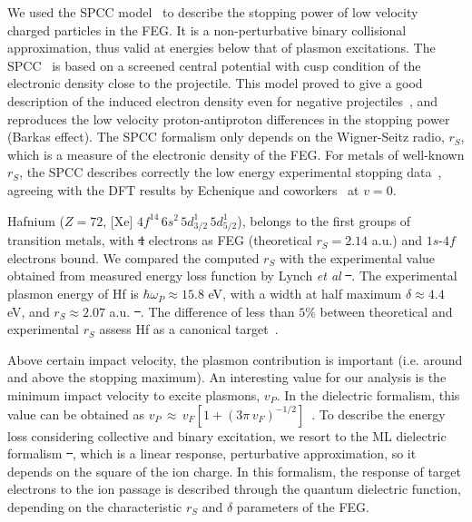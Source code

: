 \documentclass[aps,pra,reprint,groupedaddress,showpacs,showkeys]{revtex4-1} %
\providecommand{\DIFadd}[1]{{\protect\color{blue}\uwave{#1}}} %
\providecommand{\DIFdel}[1]{{\protect\color{red}\sout{#1}}}                      %
\providecommand{\DIFaddbegin}{} %
\providecommand{\DIFaddend}{} %
\providecommand{\DIFdelbegin}{} %
\providecommand{\DIFdelend}{} %
\newcommand{\DIFscaledelfig}{0.5}
\newlength{\DIFdelgraphicswidth} %
\newlength{\DIFdelgraphicsheight} %
\newcommand{\DIFaddincludegraphics}[2][]{{\color{blue}\fbox{\DIFOincludegraphics[#1]{#2}}}} %
\newcommand{\DIFdelincludegraphics}[2][]{%
\sbox{\DIFdelgraphicsbox}{\DIFOincludegraphics[#1]{#2}}%
\settoboxwidth{\DIFdelgraphicswidth}{\DIFdelgraphicsbox} %
\settoboxtotalheight{\DIFdelgraphicsheight}{\DIFdelgraphicsbox} %
\scalebox{\DIFscaledelfig}{%
\parbox[b]{\DIFdelgraphicswidth}{\usebox{\DIFdelgraphicsbox}\\[-\baselineskip] \rule{\DIFdelgraphicswidth}{0em}}\llap{\resizebox{\DIFdelgraphicswidth}{\DIFdelgraphicsheight}{%
\setlength{\unitlength}{\DIFdelgraphicswidth}%
\begin{picture}(1,1)%
\thicklines\linethickness{2pt} %
{\color[rgb]{1,0,0}\put(0,0){\framebox(1,1){}}}%
{\color[rgb]{1,0,0}\put(0,0){\line( 1,1){1}}}%
{\color[rgb]{1,0,0}\put(0,1){\line(1,-1){1}}}%
\end{picture}%
}\hspace*{3pt}}} %
} %
\DeclareRobustCommand{\DIFaddbegin}{\DIFOaddbegin \let\includegraphics\DIFaddincludegraphics} %
\DeclareRobustCommand{\DIFaddend}{\DIFOaddend \let\includegraphics\DIFOincludegraphics} %
\DeclareRobustCommand{\DIFdelbegin}{\DIFOdelbegin \let\includegraphics\DIFdelincludegraphics} %
\DeclareRobustCommand{\DIFdelend}{\DIFOaddend \let\includegraphics\DIFOincludegraphics} %
\begin{document}
We used the SPCC model~\cite{mon17} to describe the stopping power of 
low velocity charged particles in the FEG. It is a non-perturbative 
binary collisional approximation, thus valid at energies below that of 
plasmon excitations.  The SPCC~\cite{mon17} is based on a screened 
central potential with cusp condition of the electronic density close 
to the projectile. This model proved to give a good description of the 
induced electron density even for negative projectiles~\cite{mon17}, 
and reproduces the low velocity proton-antiproton differences in the 
stopping power (Barkas effect). The SPCC formalism only depends on the 
Wigner-Seitz radio, $r_S$, which is a measure of the electronic density 
of the FEG. For metals of well-known $r_S$, the SPCC describes correctly 
the low energy experimental stopping data~\cite{mon17}, agreeing with 
the DFT results by Echenique and coworkers~\cite{eche81,nagy89} at $v=0$. 

Hafnium ($Z=72$, [Xe] $4f^{14}\,6s^2\,5d_{3/2}^1\,5d_{5/2}^1$), belongs 
to the first groups of transition metals, with \DIFdelbegin \DIFdel{4 }\DIFdelend \DIFaddbegin \DIFadd{four }\DIFaddend electrons as FEG 
(theoretical $r_S=2.14$ a.u.) and $1s$-$4f$ electrons bound. We compared 
the computed $r_S$ with the experimental value obtained from measured 
energy loss function by Lynch \textit{et al} \DIFdelbegin \DIFdel{~}\DIFdelend \cite{lynch75}. The 
experimental plasmon energy of Hf is $\hbar\omega_P \approx 15.8$ eV, 
with a width at half maximum $\delta \approx 4.4$ eV, and 
$r_S \approx 2.07$ a.u. \DIFdelbegin \DIFdel{~}\DIFdelend \cite{lynch75}. The difference of less than 
$5\%$ between theoretical and experimental $r_S$ assess Hf as a 
canonical target~\cite{mon17}.

Above certain impact velocity, the plasmon contribution is important 
(i.e. around and above the stopping maximum). An interesting value for 
our analysis is the minimum impact velocity to excite plasmons, $v_P$. 
In the dielectric formalism, this value can be obtained as 
$v_P\,\approx\,v_F[1+(3\pi\,v_F)^{-1/2}]$~\cite{suppression}. To 
describe the energy loss considering collective and binary excitation, 
we resort to the ML dielectric formalism \DIFdelbegin \DIFdel{~}\DIFdelend \cite{Mermin}, which is a 
linear response, perturbative approximation, so it depends on the 
square of the ion charge. In this formalism, the response of target 
electrons to the ion passage is described through the quantum dielectric 
function, depending on the characteristic $r_S$ and $\delta$ parameters 
of the FEG. 
\end{document}

